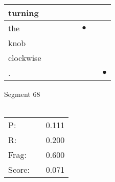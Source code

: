 \documentclass[landscape]{article}
\newcommand{\ssp}{\hspace{2pt}}
\newcommand{\mex}{\cellcolor{g}$\bullet$}
\begin{document}
\begin{tabular}{|l|p{10pt}|p{10pt}|p{10pt}|p{10pt}|p{10pt}|p{10pt}|p{10pt}|}
\hline
\ssp turning \ssp&\hspace{2pt}&\hspace{2pt}&\hspace{2pt}&\hspace{2pt}&\hspace{2pt}&\hspace{2pt}&\hspace{2pt}\\
\hline
\ssp \cellcolor{ref4}the \ssp&\hspace{2pt}&\hspace{2pt}&\hspace{2pt}&\hspace{2pt}&\hspace{2pt}\mex&\hspace{2pt}&\hspace{2pt}\\
\hline
\ssp knob \ssp&\hspace{2pt}&\hspace{2pt}&\hspace{2pt}&\hspace{2pt}&\hspace{2pt}&\hspace{2pt}&\hspace{2pt}\\
\hline
\ssp clockwise \ssp&\hspace{2pt}&\hspace{2pt}&\hspace{2pt}&\hspace{2pt}&\hspace{2pt}&\hspace{2pt}&\hspace{2pt}\\
\hline
\ssp \cellcolor{ref6}. \ssp&\hspace{2pt}&\hspace{2pt}&\hspace{2pt}&\hspace{2pt}&\hspace{2pt}&\hspace{2pt}&\hspace{2pt}\mex\\
\hline
\end{tabular}

\vspace{6pt}
\noindent Segment 68\\\\
\noindent\begin{tabular}{lm{12pt}r}
\hline
P:&&0.111\\
R:&&0.200\\
Frag:&&0.600\\
Score:&&0.071\\
\end{tabular}
\end{document}
